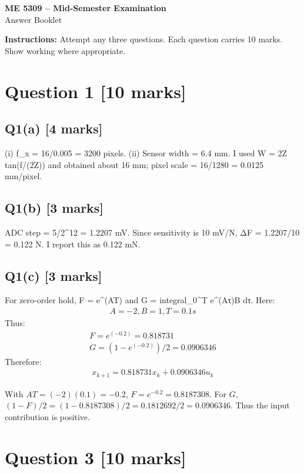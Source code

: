 \documentclass[11pt,a4paper]{article}
\begin{document}
\begin{center}
{\Large\bfseries ME 5309 -- Mid-Semester Examination}\\[3pt]
{\large Answer Booklet}\\[8pt]
\end{center}
\textbf{Instructions:} Attempt any three questions. Each question carries 10 marks. Show working where appropriate.
\section*{Question 1 \hfill [10 marks]}
\subsection*{Q1(a) \hfill [4 marks]}

(i) f\_x = 16/0.005 = 3200 pixels.
(ii) Sensor width = 6.4 mm.
I used W = 2Z tan(f/(2Z)) and obtained about 16 mm; pixel scale = 16/1280 = 0.0125 mm/pixel.

\subsection*{Q1(b) \hfill [3 marks]}

ADC step = 5/2\textasciicircum{}12 = 1.2207 mV.
Since sensitivity is 10 mV/N, ΔF = 1.2207/10 = 0.122 N.
I report this as 0.122 mN.

\subsection*{Q1(c) \hfill [3 marks]}

For zero-order hold, F = e\textasciicircum{}(AT) and G = integral\_0\textasciicircum{}T e\textasciicircum{}(Aτ)B dτ.
Here:\[\begin{aligned}A = -2, B = 1, T = 0.1 s\end{aligned}\]
Thus:\[\begin{aligned}F = e^(-0.2) = 0.818731\\ G = (1-e^(-0.2))/2 = 0.0906346\end{aligned}\]
Therefore:\[\begin{aligned}x_{k+1} = 0.818731 x_k + 0.0906346 u_k\end{aligned}\]\par\smallskip With $AT=(-2)(0.1)=-0.2$, $F=e^{-0.2}=0.8187308$. For $G$, $(1-F)/2=(1-0.8187308)/2=0.1812692/2=0.0906346$. Thus the input contribution is positive.

\section*{Question 3 \hfill [10 marks]}
\end{document}

